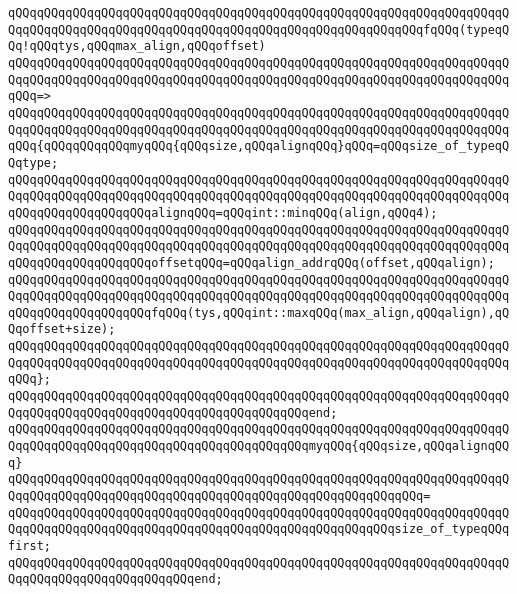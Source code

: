 \verb|qQQqqQQqqQQqqQQqqQQqqQQqqQQqqQQqqQQqqQQqqQQqqQQqqQQqqQQqqQQqqQQqqQQqqQQqqQQqqQQqqQQqqQQqqQQqqQQqqQQqqQQqqQQqqQQqqQQqqQQqqQQqqQQqfqQQq(typeqQQq!qQQqtys,qQQqmax_align,qQQqoffset)|\newline
\verb|qQQqqQQqqQQqqQQqqQQqqQQqqQQqqQQqqQQqqQQqqQQqqQQqqQQqqQQqqQQqqQQqqQQqqQQqqQQqqQQqqQQqqQQqqQQqqQQqqQQqqQQqqQQqqQQqqQQqqQQqqQQqqQQqqQQqqQQqqQQqqQQq=>|\newline
\verb|qQQqqQQqqQQqqQQqqQQqqQQqqQQqqQQqqQQqqQQqqQQqqQQqqQQqqQQqqQQqqQQqqQQqqQQqqQQqqQQqqQQqqQQqqQQqqQQqqQQqqQQqqQQqqQQqqQQqqQQqqQQqqQQqqQQqqQQqqQQqqQQq{qQQqqQQqqQQqmyqQQq{qQQqsize,qQQqalignqQQq}qQQq=qQQqsize_of_typeqQQqtype;|\newline
\verb|qQQqqQQqqQQqqQQqqQQqqQQqqQQqqQQqqQQqqQQqqQQqqQQqqQQqqQQqqQQqqQQqqQQqqQQqqQQqqQQqqQQqqQQqqQQqqQQqqQQqqQQqqQQqqQQqqQQqqQQqqQQqqQQqqQQqqQQqqQQqqQQqqQQqqQQqqQQqqQQqalignqQQq=qQQqint::minqQQq(align,qQQq4);|\newline
\verb|qQQqqQQqqQQqqQQqqQQqqQQqqQQqqQQqqQQqqQQqqQQqqQQqqQQqqQQqqQQqqQQqqQQqqQQqqQQqqQQqqQQqqQQqqQQqqQQqqQQqqQQqqQQqqQQqqQQqqQQqqQQqqQQqqQQqqQQqqQQqqQQqqQQqqQQqqQQqqQQqoffsetqQQq=qQQqalign_addrqQQq(offset,qQQqalign);|\newline
\newline
\verb|qQQqqQQqqQQqqQQqqQQqqQQqqQQqqQQqqQQqqQQqqQQqqQQqqQQqqQQqqQQqqQQqqQQqqQQqqQQqqQQqqQQqqQQqqQQqqQQqqQQqqQQqqQQqqQQqqQQqqQQqqQQqqQQqqQQqqQQqqQQqqQQqqQQqqQQqqQQqqQQqfqQQq(tys,qQQqint::maxqQQq(max_align,qQQqalign),qQQqoffset+size);|\newline
\verb|qQQqqQQqqQQqqQQqqQQqqQQqqQQqqQQqqQQqqQQqqQQqqQQqqQQqqQQqqQQqqQQqqQQqqQQqqQQqqQQqqQQqqQQqqQQqqQQqqQQqqQQqqQQqqQQqqQQqqQQqqQQqqQQqqQQqqQQqqQQqqQQq};|\newline
\verb|qQQqqQQqqQQqqQQqqQQqqQQqqQQqqQQqqQQqqQQqqQQqqQQqqQQqqQQqqQQqqQQqqQQqqQQqqQQqqQQqqQQqqQQqqQQqqQQqqQQqqQQqqQQqqQQqend;|\newline
\newline
\verb|qQQqqQQqqQQqqQQqqQQqqQQqqQQqqQQqqQQqqQQqqQQqqQQqqQQqqQQqqQQqqQQqqQQqqQQqqQQqqQQqqQQqqQQqqQQqqQQqqQQqqQQqqQQqqQQqmyqQQq{qQQqsize,qQQqalignqQQq}|\newline
\verb|qQQqqQQqqQQqqQQqqQQqqQQqqQQqqQQqqQQqqQQqqQQqqQQqqQQqqQQqqQQqqQQqqQQqqQQqqQQqqQQqqQQqqQQqqQQqqQQqqQQqqQQqqQQqqQQqqQQqqQQqqQQqqQQq=|\newline
\verb|qQQqqQQqqQQqqQQqqQQqqQQqqQQqqQQqqQQqqQQqqQQqqQQqqQQqqQQqqQQqqQQqqQQqqQQqqQQqqQQqqQQqqQQqqQQqqQQqqQQqqQQqqQQqqQQqqQQqqQQqqQQqsize_of_typeqQQqfirst;|\newline
\verb|qQQqqQQqqQQqqQQqqQQqqQQqqQQqqQQqqQQqqQQqqQQqqQQqqQQqqQQqqQQqqQQqqQQqqQQqqQQqqQQqqQQqqQQqqQQqqQQqend;|\newline
